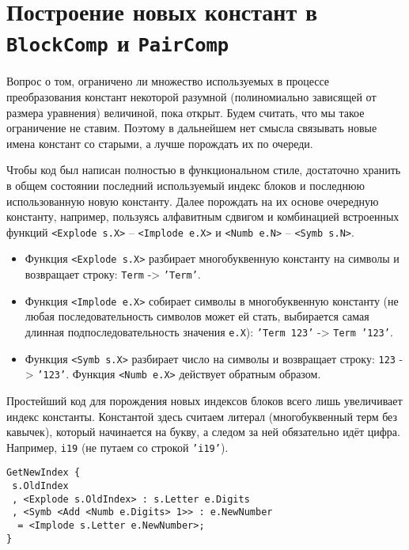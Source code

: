\documentclass[12pt]{article}
\begin{document}
\section{Построение новых констант в \texttt{BlockComp} и \texttt{PairComp}}

Вопрос о том, ограничено ли множество используемых в процессе преобразования констант некоторой разумной (полиномиально зависящей от размера уравнения) величиной, пока открыт. Будем считать, что мы такое ограничение не ставим. Поэтому в дальнейшем нет смысла связывать новые имена констант со старыми, а лучше порождать их по очереди.

Чтобы код был написан полностью в функциональном стиле, достаточно хранить в общем состоянии последний используемый индекс блоков и последнюю использованную новую константу. Далее порождать на их основе очередную константу, например, пользуясь алфавитным сдвигом и комбинацией встроенных функций \texttt{<Explode s.X>} -- \texttt{<Implode e.X>} и \texttt{<Numb e.N>} -- \texttt{<Symb s.N>}.

\begin{itemize}
\item Функция \texttt{<Explode s.X>} разбирает многобуквенную константу на символы и возвращает строку: \texttt{Term} -> \texttt{'Term'}.
\item Функция \texttt{<Implode e.X>} собирает символы в многобуквенную константу (не любая последовательность символов может ей стать, выбирается самая длинная подпоследовательность значения \texttt{e.X}): \texttt{'Term 123'} -> \texttt{Term '123'}.
\item Функция \texttt{<Symb s.X>} разбирает число на символы и возвращает строку: \texttt{123} -> \texttt{'123'}. Функция \texttt{<Numb e.X>} действует обратным образом.
\end{itemize}

Простейший код для порождения новых индексов блоков всего лишь увеличивает индекс константы. Константой здесь считаем литерал (многобуквенный терм без кавычек), который начинается на букву, а следом за ней обязательно идёт цифра. Например, \texttt{i19} (не путаем со строкой \texttt{'i19'}).

\begin{verbatim}
GetNewIndex {
 s.OldIndex
 , <Explode s.OldIndex> : s.Letter e.Digits
 , <Symb <Add <Numb e.Digits> 1>> : e.NewNumber
  = <Implode s.Letter e.NewNumber>;
}
\end{verbatim}
\end{document}
